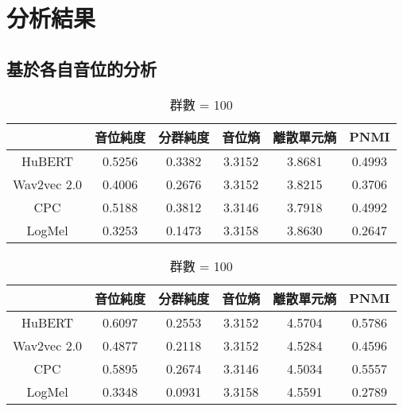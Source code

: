 
\section{分析結果}


\subsection{基於各自音位的分析}

\begin{table}[!htbp]
    \centering
    \begin{subtable}[t]{\textwidth}
        \centering
        \begin{tabular}{|c|c|c|c|c|c|} \hline
                        & 音位純度   & 分群純度   & 音位熵    & 離散單元熵  & PNMI   \\ \hline
            HuBERT      & 0.5256 & 0.3382 & 3.3152 & 3.8681 & 0.4993 \\ \hline    %
            Wav2vec 2.0 & 0.4006 & 0.2676 & 3.3152 & 3.8215 & 0.3706 \\ \hline    %
            CPC         & 0.5188 & 0.3812 & 3.3146 & 3.7918 & 0.4992 \\ \hline    %
            LogMel      & 0.3253 & 0.1473 & 3.3158 & 3.8630 & 0.2647 \\ \hline    %
        \end{tabular}
        \caption{群數 = 50}
        \label{tab:ch3-clu050-phn}
    \end{subtable}

    \vspace{0.5cm}

    \begin{subtable}[t]{\textwidth}
        \centering
        \begin{tabular}{|c|c|c|c|c|c|} \hline
                        & 音位純度   & 分群純度   & 音位熵    & 離散單元熵  & PNMI   \\ \hline
            HuBERT      & 0.6097 & 0.2553 & 3.3152 & 4.5704 & 0.5786 \\ \hline    %
            Wav2vec 2.0 & 0.4877 & 0.2118 & 3.3152 & 4.5284 & 0.4596 \\ \hline    %
            CPC         & 0.5895 & 0.2674 & 3.3146 & 4.5034 & 0.5557 \\ \hline    %
            LogMel      & 0.3348 & 0.0931 & 3.3158 & 4.5591 & 0.2789 \\ \hline    %
        \end{tabular}
        \caption{群數 = 100}
        \label{tab:ch3-clu100-phn}
    \end{subtable}


\end{table}
